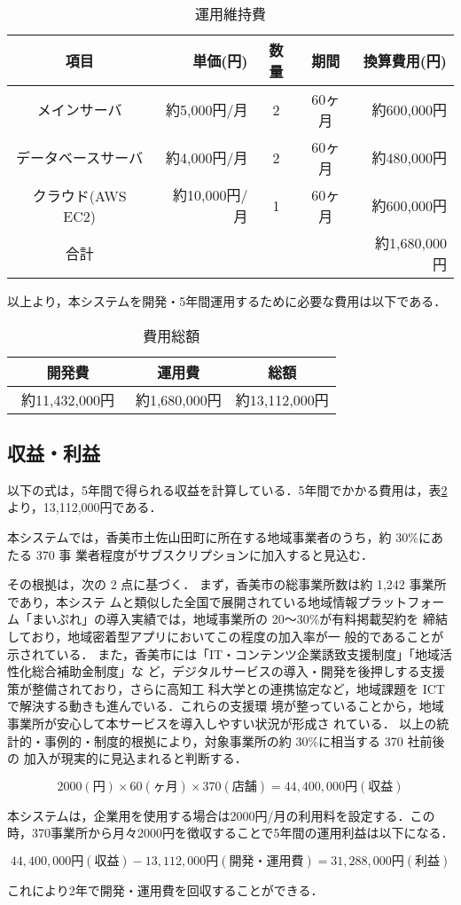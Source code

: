 \begin{table}[h]
  \centering
  \caption{運用維持費}
  \label{fig:Q11}
  \begin{tabular}{crccr}
  \hline
  項目  & 単価(円) & 数量  & 期間 & 換算費用(円) \\ \hline\hline
 
メインサーバ  & 約5,000円/月 & 2& 60ヶ月  & 約600,000円 \\ \hline

データベースサーバ & 約4,000円/月 &2& 60ヶ月 & 約480,000円 \\\hline

クラウド(AWS EC2)  &約10,000円/月&1 &60ヶ月 & 約600,000円 \\ \hline\hline

合計 &  & & & 約1,680,000円\\ \hline
\end{tabular}
\end{table}

以上より，本システムを開発・5年間運用するために必要な費用は以下である．
\begin{table}[h]
  \centering
  \caption{費用総額}
  \label{fig:Q12}
  \begin{tabular}{ccc}
  \hline
  開発費 & 運用費 & 総額  \\ \hline\hline
 約11,432,000円　& 約1,680,000円 & 約13,112,000円\\ \hline

\end{tabular}
\end{table}


\subsection{収益・利益}
以下の式は，5年間で得られる収益を計算している．5年間でかかる費用は，表\ref{fig:Q12}より，13,112,000円である．\par

本システムでは，香美市土佐山田町に所在する地域事業者のうち，約 30\%にあたる 370 事
業者程度がサブスクリプションに加入すると見込む．

その根拠は，次の 2 点に基づく．
まず，香美市の総事業所数は約 1,242 事業所であり\cite{label4}，本システ
ムと類似した全国で展開されている地域情報プラットフォーム「まいぷれ」\cite{label5}の導入実績では，地域事業所の 20〜30\%が有料掲載契約を
締結しており，地域密着型アプリにおいてこの程度の加入率が一
般的であることが示されている．
また，香美市には「IT・コンテンツ企業誘致支援制度」「地域活性化総合補助金制度」な
ど，デジタルサービスの導入・開発を後押しする支援策が整備されており，さらに高知工
科大学との連携協定など，地域課題を ICT で解決する動きも進んでいる．これらの支援環
境が整っていることから，地域事業所が安心して本サービスを導入しやすい状況が形成さ
れている．
以上の統計的・事例的・制度的根拠により，対象事業所の約 30\%に相当する 370 社前後の
加入が現実的に見込まれると判断する．

\[2000(円)\times 60(ヶ月)\times 370(店舗)=44,400,000円(収益)\]


本システムは，企業用を使用する場合は2000円/月の利用料を設定する．この時，370事業所から月々2000円を徴収することで5年間の運用利益は以下になる．\par

\[44,400,000円(収益)-13,112,000円(開発・運用費)=31,288,000円(利益)\]

これにより2年で開発・運用費を回収することができる．








